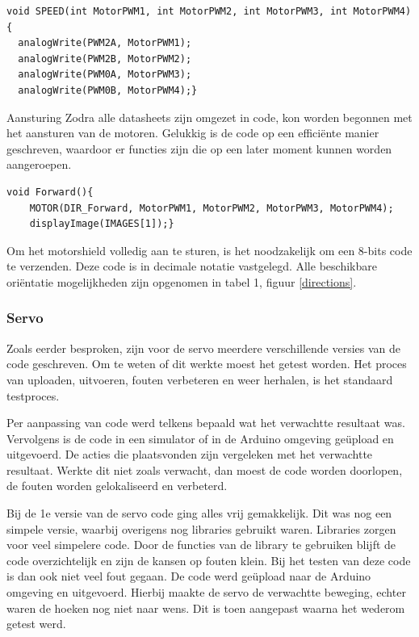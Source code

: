 \begin{lstlisting}
void SPEED(int MotorPWM1, int MotorPWM2, int MotorPWM3, int MotorPWM4){ 
  analogWrite(PWM2A, MotorPWM1); 
  analogWrite(PWM2B, MotorPWM2);
  analogWrite(PWM0A, MotorPWM3);
  analogWrite(PWM0B, MotorPWM4);}
\end{lstlisting}

Aansturing
Zodra alle datasheets \cite{shiftregister}\cite{h-brug} zijn omgezet in code, kon worden begonnen met het aansturen van de motoren\cite{h-brug}. Gelukkig is de code op een efficiënte manier geschreven, waardoor er functies zijn die op een later moment kunnen worden aangeroepen. 
\begin{lstlisting}
void Forward(){
    MOTOR(DIR_Forward, MotorPWM1, MotorPWM2, MotorPWM3, MotorPWM4);
    displayImage(IMAGES[1]);}
\end{lstlisting}

Om het \gls{motorshield} volledig aan te sturen, is het noodzakelijk om een 8-bits code te verzenden. Deze code is in decimale notatie vastgelegd. Alle beschikbare oriëntatie mogelijkheden zijn opgenomen in tabel 1, figuur \ref{directions}.

\subsubsection{Servo}
Zoals eerder besproken, zijn voor de servo meerdere verschillende versies van de code geschreven. Om te weten of dit werkte moest het getest worden. Het proces van uploaden, uitvoeren, fouten verbeteren en weer herhalen, is het standaard testproces.

Per aanpassing van code werd telkens bepaald wat het verwachtte resultaat was. Vervolgens is de code in een simulator of in de Arduino omgeving geüpload en uitgevoerd. De acties die plaatsvonden zijn vergeleken met het verwachtte resultaat. Werkte dit niet zoals verwacht, dan moest de code worden doorlopen, de fouten worden gelokaliseerd en verbeterd. 

Bij de 1e versie van de servo code ging alles vrij gemakkelijk. Dit was nog een simpele versie, waarbij overigens nog libraries gebruikt waren. Libraries zorgen voor veel simpelere code. Door de functies van de library te gebruiken blijft de code overzichtelijk en zijn de kansen op fouten klein. Bij het testen van deze code is dan ook niet veel fout gegaan. De code werd geüpload naar de Arduino omgeving en uitgevoerd. Hierbij maakte de servo de verwachtte beweging, echter waren de hoeken nog niet naar wens. Dit is toen aangepast waarna het wederom getest werd. 

